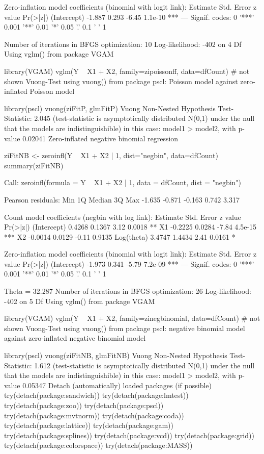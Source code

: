 Zero-inflation model coefficients (binomial with logit link):
            Estimate Std. Error z value Pr(>|z|)    
(Intercept)   -1.887      0.293   -6.45  1.1e-10 ***
---
Signif. codes:  0 '***' 0.001 '**' 0.01 '*' 0.05 '.' 0.1 ' ' 1 

Number of iterations in BFGS optimization: 10 
Log-likelihood: -402 on 4 Df
Using vglm() from package VGAM

library(VGAM)
vglm(Y ~ X1 + X2, family=zipoissonff, data=dfCount)
# not shown
Vuong-Test using vuong() from package pscl: Poisson model against zero-inflated Poisson model

library(pscl)
vuong(ziFitP, glmFitP)
Vuong Non-Nested Hypothesis Test-Statistic: 2.045 
(test-statistic is asymptotically distributed N(0,1) under the
 null that the models are indistinguishible)
in this case:
model1 > model2, with p-value 0.02041 
Zero-inflated negative binomial regression

ziFitNB <- zeroinfl(Y ~ X1 + X2 | 1, dist="negbin", data=dfCount)
summary(ziFitNB)

Call:
zeroinfl(formula = Y ~ X1 + X2 | 1, data = dfCount, dist = "negbin")

Pearson residuals:
   Min     1Q Median     3Q    Max 
-1.635 -0.871 -0.163  0.742  3.317 

Count model coefficients (negbin with log link):
            Estimate Std. Error z value Pr(>|z|)    
(Intercept)   0.4268     0.1367    3.12   0.0018 ** 
X1           -0.2225     0.0284   -7.84  4.5e-15 ***
X2           -0.0014     0.0129   -0.11   0.9135    
Log(theta)    3.4747     1.4434    2.41   0.0161 *  

Zero-inflation model coefficients (binomial with logit link):
            Estimate Std. Error z value Pr(>|z|)    
(Intercept)   -1.973      0.341   -5.79  7.2e-09 ***
---
Signif. codes:  0 '***' 0.001 '**' 0.01 '*' 0.05 '.' 0.1 ' ' 1 

Theta = 32.287 
Number of iterations in BFGS optimization: 26 
Log-likelihood: -402 on 5 Df
Using vglm() from package VGAM

library(VGAM)
vglm(Y ~ X1 + X2, family=zinegbinomial, data=dfCount)
# not shown
Vuong-Test using vuong() from package pscl: negative binomial model against zero-inflated negative binomial model

library(pscl)
vuong(ziFitNB, glmFitNB)
Vuong Non-Nested Hypothesis Test-Statistic: 1.612 
(test-statistic is asymptotically distributed N(0,1) under the
 null that the models are indistinguishible)
in this case:
model1 > model2, with p-value 0.05347 
Detach (automatically) loaded packages (if possible)
try(detach(package:sandwich))
try(detach(package:lmtest))
try(detach(package:zoo))
try(detach(package:pscl))
try(detach(package:mvtnorm))
try(detach(package:coda))
try(detach(package:lattice))
try(detach(package:gam))
try(detach(package:splines))
try(detach(package:vcd))
try(detach(package:grid))
try(detach(package:colorspace))
try(detach(package:MASS))
